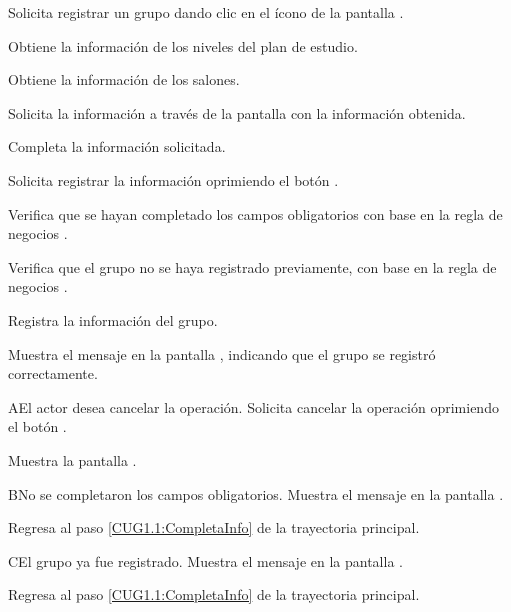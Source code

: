 \begin{UCtrayectoria}
	\UCpaso [\UCactor] Solicita registrar un grupo dando clic en el ícono \btnRegistrar de la pantalla . 
	
	\UCpaso [\UCsist] Obtiene la información de los niveles del plan de estudio.	

	\UCpaso [\UCsist] Obtiene la información de los salones.
		
	\UCpaso [\UCsist] Solicita la información a través de la pantalla  con la información obtenida.
	
	\UCpaso [\UCactor] Completa la información solicitada. \label{CUG1.1:CompletaInfo}
	
	\UCpaso [\UCactor] Solicita registrar la información oprimiendo el botón . 
	
	\UCpaso [\UCsist] Verifica que se hayan completado los campos obligatorios con base en la regla de negocios . 
	
	\UCpaso [\UCsist] Verifica que el grupo no se haya registrado previamente, con base en la regla de negocios . 
	
	\UCpaso [\UCsist] Registra la información del grupo.
	
	\UCpaso [\UCsist] Muestra el mensaje  en la pantalla , indicando que el grupo se registró correctamente.	
	
\end{UCtrayectoria}


\begin{UCtrayectoriaA}{A}{El actor desea cancelar la operación.}
	\UCpaso [\UCactor] Solicita cancelar la operación oprimiendo el botón .
	
	\UCpaso [\UCsist] Muestra la pantalla . 
\end{UCtrayectoriaA}

\begin{UCtrayectoriaA}{B}{No se completaron los campos obligatorios.}
	\UCpaso [\UCsist] Muestra el mensaje  en la pantalla .
	
	\UCpaso Regresa al paso \ref{CUG1.1:CompletaInfo} de la trayectoria principal.
\end{UCtrayectoriaA}

\begin{UCtrayectoriaA}{C}{El grupo ya fue registrado.}
	\UCpaso [\UCsist] Muestra el mensaje  en la pantalla .
	
	\UCpaso Regresa al paso \ref{CUG1.1:CompletaInfo} de la trayectoria principal.
\end{UCtrayectoriaA}
